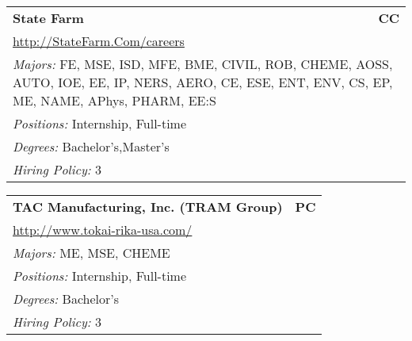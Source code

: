 \documentclass[twoside]{article}
\begin{document}
\begin{center}
\begin{multicols}{3}
\begin{FlushLeft}
\begin{minipage}{.9\columnwidth}
\end{minipage}
 
\begin{minipage}{.9\columnwidth}\begin{tabularx}{.95\columnwidth}{Xr}
                 {\Large\bf State Farm} & {\Large\bf CC}\\
    \multicolumn{2}{p{.95\columnwidth}}{\url{http://StateFarm.Com/careers}}\\
    \multicolumn{2}{p{.95\columnwidth}}{\emph{Majors:} FE, MSE, ISD, MFE, BME, CIVIL, ROB, CHEME, AOSS, AUTO, IOE, EE, IP, NERS, AERO, CE, ESE, ENT, ENV, CS, EP, ME, NAME, APhys, PHARM, EE:S}\\
    \multicolumn{2}{p{.95\columnwidth}}{\emph{Positions:} Internship, Full-time}\\
    \multicolumn{2}{p{.95\columnwidth}}{\emph{Degrees:} Bachelor's,Master's}\\
    \multicolumn{2}{p{.95\columnwidth}}{\emph{Hiring Policy:} 3}\\
    \end{tabularx}
    
\end{minipage}
 
\begin{minipage}{.9\columnwidth}\begin{tabularx}{.95\columnwidth}{Xr}
                 {\Large\bf TAC Manufacturing, Inc. (TRAM Group)} & {\Large\bf PC}\\
    \multicolumn{2}{p{.95\columnwidth}}{\url{http://www.tokai-rika-usa.com/}}\\
    \multicolumn{2}{p{.95\columnwidth}}{\emph{Majors:} ME, MSE, CHEME}\\
    \multicolumn{2}{p{.95\columnwidth}}{\emph{Positions:} Internship, Full-time}\\
    \multicolumn{2}{p{.95\columnwidth}}{\emph{Degrees:} Bachelor's}\\
    \multicolumn{2}{p{.95\columnwidth}}{\emph{Hiring Policy:} 3}\\
    \end{tabularx}
    
\end{minipage}
 

\end{FlushLeft}
\end{multicols}
\end{center}
\end{document}

